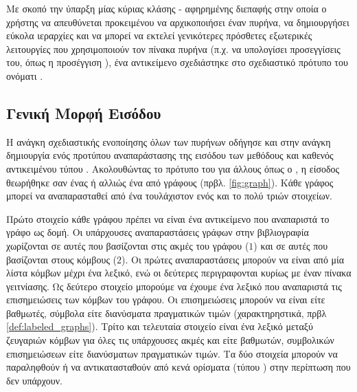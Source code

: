 Με σκοπό την ύπαρξη μίας κύριας κλάσης - αφηρημένης διεπαφής στην οποία ο χρήστης να απευθύνεται προκειμένου να αρχικοποιήσει έναν πυρήνα, να δημιουργήσει εύκολα ιεραρχίες  και να μπορεί να εκτελεί γενικότερες πρόσθετες εξωτερικές λειτουργίες που χρησιμοποιούν τον πίνακα πυρήνα (π.χ. να υπολογίσει προσεγγίσεις του, όπως η προσέγγιση ), ένα αντικείμενο σχεδιάστηκε στο σχεδιαστικό πρότυπο του  ονόματι \texttt{}.

\subsection{Γενική Μορφή Εισόδου}
Η ανάγκη σχεδιαστικής ενοποίησης όλων των πυρήνων οδήγησε και στην ανάγκη δημιουργία ενός προτύπου αναπαράστασης της εισόδου των μεθόδους  και  καθενός αντικειμένου τύπου .
Ακολουθώντας το πρότυπο του  για άλλους  όπως ο , η είσοδος θεωρήθηκε σαν ένας \textit{} ή αλλιώς ένα  από γράφους (πρβλ. \ref{fig:graph}).
Κάθε γράφος μπορεί να αναπαρασταθεί από ένα  τουλάχιστον ενός και το πολύ τριών στοιχείων.

Πρώτο στοιχείο κάθε γράφου πρέπει να είναι ένα αντικείμενο που αναπαριστά το γράφο ως δομή.
Οι υπάρχουσες αναπαραστάσεις γράφων στην βιβλιογραφία χωρίζονται σε αυτές που βασίζονται στις ακμές του γράφου ($1$) και σε αυτές που βασίζονται στους κόμβους ($2$).
Οι πρώτες αναπαραστάσεις μπορούν να είναι από μία λίστα κόμβων μέχρι ένα λεξικό, ενώ οι δεύτερες περιγραφονται κυρίως με έναν πίνακα γειτνίασης.
Ως δεύτερο στοιχείο μπορούμε να έχουμε ένα λεξικό που αναπαριστά τις επισημειώσεις των κόμβων του γράφου. Οι επισημειώσεις μπορούν να είναι είτε βαθμωτές, σύμβολα είτε διανύσματα πραγματικών τιμών (χαρακτηρηστικά, πρβλ \ref{def:labeled_graphs}).
Τρίτο και τελευταία στοιχείο είναι ένα λεξικό μεταξύ ζευγαριών κόμβων για όλες τις υπάρχουσες ακμές και είτε βαθμωτών, συμβολικών επισημειώσεων είτε διανύσματων πραγματικών τιμών.
Τα δύο στοιχεία μπορούν να παραληφθούν ή να αντικατασταθούν από κενά ορίσματα (τύπου ) στην περίπτωση που δεν υπάρχουν.

